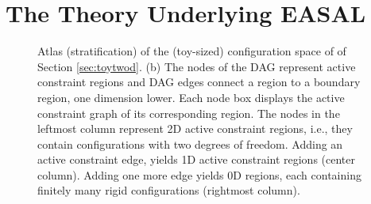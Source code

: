\section{The Theory Underlying EASAL}
\label{sec:theory}

\begin{figure}[h]
\centering
{}
{}
\caption{ Atlas (stratification) of the (toy-sized) configuration
space of \exref{\toytwod} of Section \ref{sec:toytwod}. (b) The nodes of the
DAG represent active constraint regions and DAG edges connect a region to a
boundary region, one dimension lower. Each node box displays the active
constraint graph of its corresponding region. The nodes in the leftmost column
represent 2D active constraint regions, i.e., they contain configurations with
two degrees of freedom. Adding an active constraint edge, yields 1D active
constraint regions (center column). Adding one more edge yields 0D regions,
each containing finitely many rigid configurations (rightmost column).}
\end{figure}

